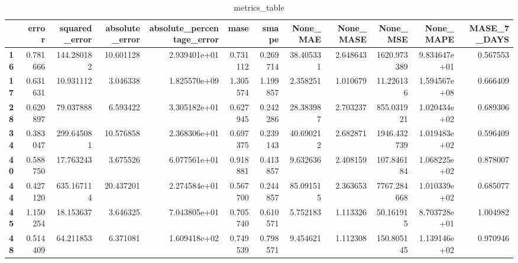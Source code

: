 \begin{table}[h]
\centering
\caption{metrics_table}
\label{table:PRedict ok-variance dataset with lstm}
\begin{tabular}{lrrrrrrrrrrr}
\toprule
{} &     error &  squared\_error &  absolute\_error &  absolute\_percentage\_error &      mase &     smape &   None\_MAE &  None\_MASE &     None\_MSE &     None\_MAPE &  MASE\_7\_DAYS \\
\midrule
\textbf{16} &  0.781666 &     144.280182 &       10.601128 &               2.939401e+01 &  0.731112 &  0.269714 &  38.405331 &   2.648643 &  1620.973389 &  9.834647e+01 &     0.567553 \\
\textbf{17} &  0.631631 &      10.931112 &        3.046338 &               1.825570e+09 &  1.305574 &  1.199857 &   2.358251 &   1.010679 &    11.226136 &  1.594567e+08 &     0.666409 \\
\textbf{28} &  0.620897 &      79.037888 &        6.593422 &               3.305182e+01 &  0.627945 &  0.242286 &  28.383987 &   2.703237 &   855.031921 &  1.020434e+02 &     0.689306 \\
\textbf{34} &  0.383047 &     299.645081 &       10.576858 &               2.368306e+01 &  0.697375 &  0.239143 &  40.690212 &   2.682871 &  1946.432739 &  1.019483e+02 &     0.596409 \\
\textbf{40} &  0.588750 &      17.763243 &        3.675526 &               6.077561e+01 &  0.918881 &  0.413857 &   9.632636 &   2.408159 &   107.846184 &  1.068225e+02 &     0.878007 \\
\textbf{44} &  0.427120 &     635.167114 &       20.437201 &               2.274584e+01 &  0.567700 &  0.244857 &  85.091515 &   2.363653 &  7767.284668 &  1.010339e+02 &     0.685077 \\
\textbf{45} &  1.150254 &      18.153637 &        3.646325 &               7.043805e+01 &  0.705740 &  0.610571 &   5.752183 &   1.113326 &    50.161915 &  8.703728e+01 &     1.004982 \\
\textbf{48} &  0.514409 &      64.211853 &        6.371081 &               1.609418e+02 &  0.749539 &  0.798571 &   9.454621 &   1.112308 &   150.805145 &  1.139146e+02 &     0.970946 \\
\bottomrule
\end{tabular}
\end{table}
